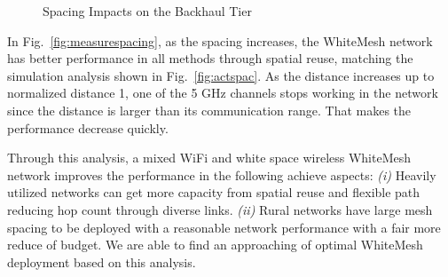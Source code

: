 \begin{figure}[t]
\centering
{}
\hfill
\caption{Spacing Impacts on the Backhaul Tier}
\label{fig:all3figs}
\vspace{-0.3in}
\end{figure}

In Fig.~\ref{fig:measurespacing}, as the spacing increases, the WhiteMesh network 
has better performance in all methods through spatial reuse, matching the simulation 
analysis shown in Fig.~\ref{fig:actspac}. As the distance increases up to normalized 
distance 1, one of the 5 GHz channels stops working in the network since the distance 
is larger than its communication range. That makes the performance decrease quickly. 

Through this analysis, a mixed WiFi and white space wireless WhiteMesh network 
improves the performance in the following achieve aspects: 
{\it (i)} Heavily utilized networks can get more capacity from spatial reuse and 
flexible path reducing hop count through diverse links. 
{\it (ii)} Rural networks have large mesh spacing to be deployed with a reasonable network performance 
with a fair more reduce of budget.
We are able to find an approaching of optimal WhiteMesh deployment based on this 
analysis.

